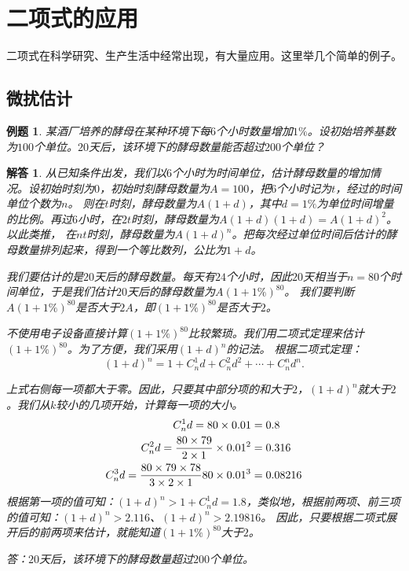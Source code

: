 \documentclass[12pt,UTF8]{ctexbook}
\newtheorem{et}{例题}[section]
\newtheorem*{so}{解答}
\begin{document}
\section{二项式的应用}

二项式在科学研究、生产生活中经常出现，有大量应用。这里举几个简单的例子。

\subsection{微扰估计}
\begin{et}
某酒厂培养的酵母在某种环境下每$6$个小时数量增加$1\%$。设初始培养基数为$100$个单位。$20$天后，该环境下的酵母数量能否超过$200$个单位？
\end{et}
\begin{so}  
    从已知条件出发，我们以$6$个小时为时间单位，估计酵母数量的增加情况。设初始时刻为$0$，初始时刻酵母数量为$A = 100$，把$6$个小时记为$t$，经过的时间单位个数为$n$。
    则在$t$时刻，酵母数量为$A(1 + d)$，其中$d=1\%$为单位时间增量的比例。再过$6$小时，在$2t$时刻，酵母数量为$A(1 + d)(1 + d) = A(1 + d)^2$。以此类推，
    在$nt$时刻，酵母数量为$A(1 + d)^n$。把每次经过单位时间后估计的酵母数量排列起来，得到一个等比数列，公比为$1 + d$。

    我们要估计的是$20$天后的酵母数量。每天有$24$个小时，因此$20$天相当于$n=80$个时间单位，于是我们估计$20$天后的酵母数量为$A(1 + 1\%)^{80}$。
    我们要判断$A(1 + 1\%)^{80}$是否大于$2A$，即$(1 + 1\%)^{80}$是否大于$2$。

    不使用电子设备直接计算$(1 + 1\%)^80$比较繁琐。我们用二项式定理来估计$(1 + 1\%)^{80}$。为了方便，我们采用$(1 + d)^n$的记法。
    根据二项式定理：
    $$(1 + d)^n = 1 + C_n^1 d + C_n^2 d^2 + \cdots + C_n^n d^n.$$
    
    上式右侧每一项都大于零。因此，只要其中部分项的和大于$2$，$(1 + d)^n$就大于$2$。我们从$k$较小的几项开始，计算每一项的大小。
    \begin{align}
        C_n^1 d = 80 \times 0.01 &= 0.8 \notag \\
        C_n^2 d = \frac{80 \times 79}{2\times 1} \times 0.01^2 &= 0.316 \notag \\ 
        C_n^3 d = \frac{80 \times 79\times 78}{3\times 2\times 1}80 \times 0.01^3 &= 0.08216 \notag
    \end{align}
    根据第一项的值可知：$(1 + d)^n > 1 + C_n^1 d = 1.8$，类似地，根据前两项、前三项的值可知：$(1 + d)^n > 2.116$、$(1 + d)^n > 2.19816$。
    因此，只要根据二项式展开后的前两项来估计，就能知道$(1 + 1\%)^{80}$大于$2$。
    
    答：$20$天后，该环境下的酵母数量超过$200$个单位。
\end{so}
\end{document}
